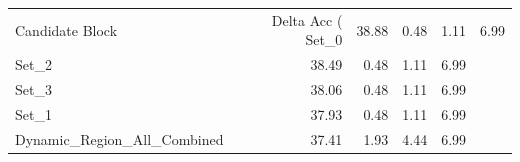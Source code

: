 \begin{tabular}{lrrrr}
\toprule
Candidate Block & Delta Acc (%
\midrule
Set_0 & 38.88 & 0.48 & 1.11 & 6.99 \\
Set_2 & 38.49 & 0.48 & 1.11 & 6.99 \\
Set_3 & 38.06 & 0.48 & 1.11 & 6.99 \\
Set_1 & 37.93 & 0.48 & 1.11 & 6.99 \\
Dynamic_Region_All_Combined & 37.41 & 1.93 & 4.44 & 6.99 \\
\bottomrule
\end{tabular}
